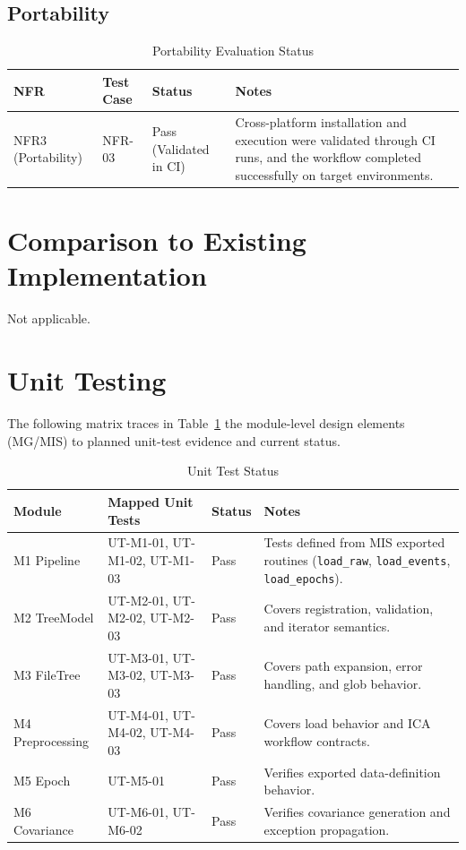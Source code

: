 \documentclass[12pt, titlepage]{article}
\begin{document}
\subsection{Portability}

\begin{table}[h]
\centering
\begin{tabularx}{\textwidth}{p{2.2cm}p{2.4cm}p{2.2cm}X}
\toprule
\textbf{NFR} & \textbf{Test Case} & \textbf{Status} & \textbf{Notes}\\
\midrule
NFR3 (Portability) & NFR-03 & Pass (Validated in CI) & Cross-platform installation and execution were validated through CI runs, and the workflow completed successfully on target environments.\\
\bottomrule
\end{tabularx}
\caption{Portability Evaluation Status}
\end{table}

\section{Comparison to Existing Implementation}

Not applicable.

\section{Unit Testing}

The following matrix traces in Table~\ref{tab:unit_test} the module-level design elements (MG/MIS) to planned unit-test evidence and current status.

\begin{table}[h]
\centering
\begin{tabularx}{\textwidth}{p{2.8cm}p{2.8cm}p{2.2cm}X}
\toprule
\textbf{Module} & \textbf{Mapped Unit Tests} & \textbf{Status} & \textbf{Notes}\\
\midrule
M1 Pipeline & UT-M1-01, UT-M1-02, UT-M1-03 & Pass & Tests defined from MIS exported routines (\texttt{load\_raw}, \texttt{load\_events}, \texttt{load\_epochs}).\\
M2 TreeModel & UT-M2-01, UT-M2-02, UT-M2-03 & Pass & Covers registration, validation, and iterator semantics.\\
M3 FileTree & UT-M3-01, UT-M3-02, UT-M3-03 & Pass & Covers path expansion, error handling, and glob behavior.\\
M4 Preprocessing & UT-M4-01, UT-M4-02, UT-M4-03 & Pass & Covers load behavior and ICA workflow contracts.\\
M5 Epoch & UT-M5-01 & Pass & Verifies exported data-definition behavior.\\
M6 Covariance & UT-M6-01, UT-M6-02 & Pass & Verifies covariance generation and exception propagation.\\
\bottomrule
\end{tabularx}
\caption{Unit Test Status}
\label{tab:unit_test}
\end{table}
\end{document}
